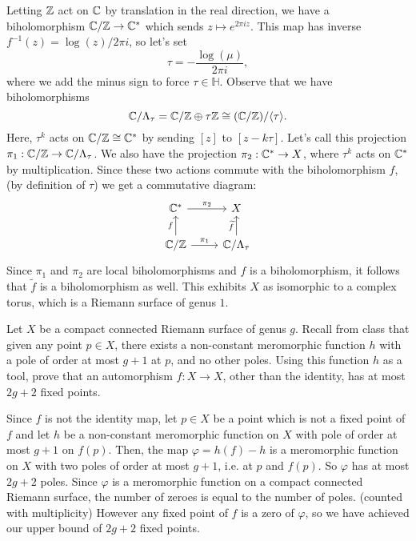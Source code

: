 \documentclass[expanded]{lkx_pset}
\begin{document}
\begin{solution}
	Letting $\mathbb{Z}$ act on $\mathbb{C}$ by translation in the real direction, we have a biholomorphism $\mathbb{C} /\mathbb{Z} \to \mathbb{C}^*$ which sends $z\mapsto e^{2\pi i z}$. This map has inverse $f^{-1}(z)=\log(z)/2\pi i$, so let's set
	\[
		\tau = -\frac{\log(\mu)}{2\pi i},
	\]
	where we add the minus sign to force $\tau\in \mathbb{H}$. Observe that we have biholomorphisms
	\[
		\mathbb{C}/\Lambda_\tau =\mathbb{C}/\mathbb{Z}\oplus \tau\mathbb{Z} \cong (\mathbb{C}/\mathbb{Z})/\langle\tau \rangle.
	\]
	Here, $\tau^k$ acts on $\mathbb{C}/\mathbb{Z}\cong \mathbb{C}^*$ by sending $[z]$ to $[z-k\tau]$. Let's call this projection $\pi_1 : \mathbb{C}/\mathbb{Z} \to \mathbb{C}/\Lambda_\tau$. We also have the projection $\pi_2 : \mathbb{C}^* \to X$, where $\tau^k$ acts on $\mathbb{C}^*$ by multiplication. Since these two actions commute with the biholomorphism $f$, (by definition of $\tau$) we get a commutative diagram:
	\[
		\begin{tikzcd}
			{\C^*} & X \\
			{\C/\Z} & {\C/\Lambda_\tau}
			\arrow["f", from=2-1, to=1-1]
			\arrow["{\widetilde{f}}", from=2-2, to=1-2]
			\arrow["{\pi_2}", from=1-1, to=1-2]
			\arrow["{\pi_1}", from=2-1, to=2-2]
		\end{tikzcd}
	\]
	Since $\pi_1$ and $\pi_2$ are local biholomorphisms and $f$ is a biholomorphism, it follows that $\widetilde{f}$ is a biholomorphism as well. This exhibits $X$ as isomorphic to a complex torus, which is a Riemann surface of genus $1$.

\end{solution}

\begin{problem}{4}
Let $X$ be a compact connected Riemann surface of genus $g$. Recall from class that given any point $p\in X$, there exists a non-constant meromorphic function $h$ with a pole of order at most $g+1$ at $p$, and no other poles. Using this function $h$ as a tool, prove that an automorphism $f : X \to X$, other than the identity, has at most $2g+2$ fixed points.
\end{problem}

\begin{solution}
	Since $f$ is not the identity map, let $p\in X$ be a point which is not a fixed point of $f$ and let $h$ be a non-constant meromorphic function on $X$ with pole of order at most $g+1$ on $f(p)$. Then, the map $\varphi = h(f)-h$ is a meromorphic function on $X$ with two poles of order at most $g+1$, i.e. at $p$ and $f(p)$. So $\varphi$ has at most $2g+2$ poles. Since $\varphi$ is a meromorphic function on a compact connected Riemann surface, the number of zeroes is equal to the number of poles. (counted with multiplicity) However any fixed point of $f$ is a zero of $\varphi$, so we have achieved our upper bound of $2g+2$ fixed points.
\end{solution}
\end{document}
